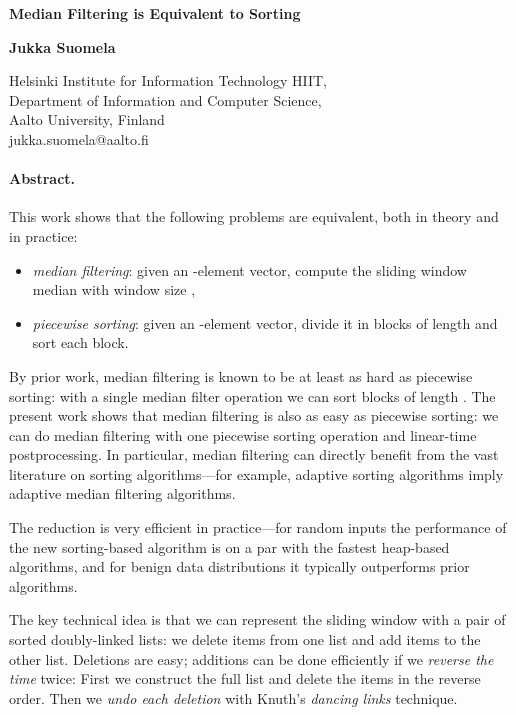 \documentclass[a4paper,11pt]{article}
\begin{document}
\begin{flushleft}
{\huge\bf Median Filtering is Equivalent to Sorting \par}
\bigskip
\bigskip
\textbf{Jukka Suomela}

Helsinki Institute for Information Technology HIIT,\\
Department of Information and Computer Science, \\ Aalto University, Finland \\
jukka.suomela@aalto.fi
\end{flushleft}

\bigskip
\paragraph{Abstract.}

This work shows that the following problems are equivalent, both in theory and in practice:
\begin{itemize}
    \item \emph{median filtering}: given an -element vector, compute the sliding window median with window size ,
    \item \emph{piecewise sorting}: given an -element vector, divide it in  blocks of length  and sort each block.
\end{itemize}
By prior work, median filtering is known to be at least as hard as piecewise sorting: with a single median filter operation we can sort  blocks of length . The present work shows that median filtering is also as easy as piecewise sorting: we can do median filtering with one piecewise sorting operation and linear-time postprocessing. In particular, median filtering can directly benefit from the vast literature on sorting algorithms---for example, adaptive sorting algorithms imply adaptive median filtering algorithms. 

The reduction is very efficient in practice---for random inputs the performance of the new sorting-based algorithm is on a par with the fastest heap-based algorithms, and for benign data distributions it typically outperforms prior algorithms.

The key technical idea is that we can represent the sliding window with a pair of sorted doubly-linked lists: we delete items from one list and add items to the other list. Deletions are easy; additions can be done efficiently if we \emph{reverse the time} twice: First we construct the full list and delete the items in the reverse order. Then we \emph{undo each deletion} with Knuth's \emph{dancing links} technique.
\end{document}
